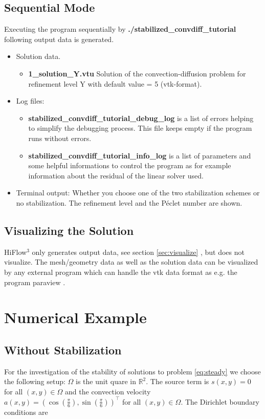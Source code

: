 \documentclass[a4paper, 11pt, twoside]{article}
\begin{document}
\subsection{Sequential Mode} 
Executing the program sequentially by \textbf{./stabilized\_convdiff\_tutorial} following output data is generated. 
\begin{itemize}
\item Solution data. 
\begin{itemize}
\item \textbf{1\_solution\_Y.vtu} Solution of the convection-diffusion problem for refinement level Y with default value = 5 (vtk-format). 
\end{itemize}
\item Log files:
\begin{itemize}
\item \textbf{stabilized\_convdiff\_tutorial\_debug\_log} is a list of errors helping to simplify the debugging process. This file keeps empty if the program runs without errors.
\item \textbf{stabilized\_convdiff\_tutorial\_info\_log} is a list of parameters and some helpful informations to control the program as for example information about the residual of the linear solver used.
\end{itemize}
\item Terminal output:  Whether you choose one of the two stabilization schemes or no stabilization. The refinement level and the P\'{e}clet number are shown. 
\end{itemize}

\subsection{Visualizing the Solution}
HiFlow$^3$ only generates output data, see section \ref{sec:visualize} , but does not visualize. The mesh/geometry data as well as the solution data can be visualized by any external program which can handle the vtk data format as e.g. the program paraview \cite{Paraview}. 

\section{Numerical Example}\label{numeric}
\subsection{Without Stabilization}\label{sec:nostab}
For the investigation of the stability of solutions to problem \eqref{eq:steady} we choose the following setup: $\Omega$ is the unit quare in $\mathbb{R}^{2}$. The source term is $s(x, y) = 0$ for all $(x, y) \in \Omega$ and the convection velocity $a(x, y) = \left(\cos(\frac{\pi}{6}), \sin(\frac{\pi}{6})\right)^{\top}$ for all $(x, y) \in \Omega$. The Dirichlet boundary conditions are
\end{document}
